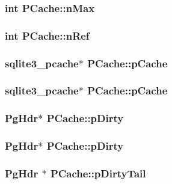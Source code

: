 \subsubsection{\setlength{\rightskip}{0pt plus 5cm}int \bf{PCache::n\-Max}}\label{structPCache_21b0144dddd4b92504e83ed015ce006c}


\subsubsection{\setlength{\rightskip}{0pt plus 5cm}int \bf{PCache::n\-Ref}}\label{structPCache_b20c69b0f2b79846b1579b0069f855f9}


\subsubsection{\setlength{\rightskip}{0pt plus 5cm}\bf{sqlite3\_\-pcache}$\ast$ \bf{PCache::p\-Cache}}\label{structPCache_93f17028d146c13f0647c208bca24a82}


\subsubsection{\setlength{\rightskip}{0pt plus 5cm}\bf{sqlite3\_\-pcache}$\ast$ \bf{PCache::p\-Cache}}\label{structPCache_93f17028d146c13f0647c208bca24a82}


\subsubsection{\setlength{\rightskip}{0pt plus 5cm}\bf{Pg\-Hdr}$\ast$ \bf{PCache::p\-Dirty}}\label{structPCache_fb664241bf7b213f32b9a7e9566c27e9}


\subsubsection{\setlength{\rightskip}{0pt plus 5cm}\bf{Pg\-Hdr}$\ast$ \bf{PCache::p\-Dirty}}\label{structPCache_fb664241bf7b213f32b9a7e9566c27e9}


\subsubsection{\setlength{\rightskip}{0pt plus 5cm}\bf{Pg\-Hdr} $\ast$ \bf{PCache::p\-Dirty\-Tail}}\label{structPCache_b093264451320f681be415d156a10f4d}


